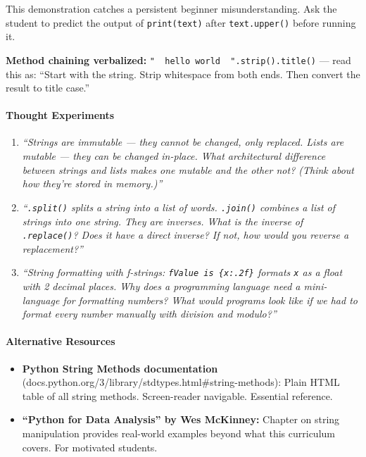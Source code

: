 \documentclass[
  justified,
  openright,
]{tufte-book}
\let\paragraph\paragraph
\let\paragraph\paragraph
\providecommand{\tightlist}{%
  \setlength{\itemsep}{0pt}\setlength{\parskip}{0pt}}
\begin{document}
This demonstration catches a persistent beginner misunderstanding. Ask
the student to predict the output of \texttt{print(text)} after
\texttt{text.upper()} before running it.

\textbf{Method chaining verbalized:}
\texttt{"\ \ hello\ world\ \ ".strip().title()} --- read this as:
``Start with the string. Strip whitespace from both ends. Then convert
the result to title case.''

\paragraph{Thought Experiments}\label{thought-experiments-11}

\begin{enumerate}
\def\labelenumi{\arabic{enumi}.}
\item
  \emph{``Strings are immutable --- they cannot be changed, only
  replaced. Lists are mutable --- they can be changed in-place. What
  architectural difference between strings and lists makes one mutable
  and the other not? (Think about how they're stored in memory.)''}
\item
  \emph{``\texttt{.split()} splits a string into a list of words.
  \texttt{.join()} combines a list of strings into one string. They are
  inverses. What is the inverse of \texttt{.replace()}? Does it have a
  direct inverse? If not, how would you reverse a replacement?''}
\item
  \emph{``String formatting with f-strings:
  \texttt{f\textquotesingle{}Value\ is\ \{x:.2f\}\textquotesingle{}}
  formats \texttt{x} as a float with 2 decimal places. Why does a
  programming language need a mini-language for formatting numbers? What
  would programs look like if we had to format every number manually
  with division and modulo?''}
\end{enumerate}

\paragraph{Alternative Resources}\label{alternative-resources-3}

\begin{itemize}
\tightlist
\item
  \textbf{Python String Methods documentation}
  (docs.python.org/3/library/stdtypes.html\#string-methods): Plain HTML
  table of all string methods. Screen-reader navigable. Essential
  reference.
\item
  \textbf{``Python for Data Analysis'' by Wes McKinney:} Chapter on
  string manipulation provides real-world examples beyond what this
  curriculum covers. For motivated students.
\end{itemize}
\end{document}
